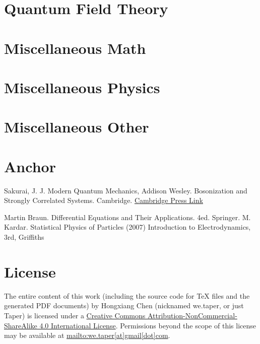 \documentclass{article}
\begin{document}
    

\section{Quantum Field Theory}
\label{sec:Quantum_Field_Theory}


\section{Miscellaneous Math}
\label{sec:Miscellnaneous_Math}


\section{Miscellaneous Physics}
\label{sec:Miscellnaneous_Physics}


\section{Miscellaneous Other}
\label{sec:Miscellaneous_Other}


\section{Anchor}
\begin{thebibliography}{1}
	 Sakurai, J. J. Modern Quantum Mechanics, Addison Wesley.
        Bosonization and Strongly Correlated Systems. Cambridge.
        \href{http://www.cambridge.org/us/academic/subjects/physics/condensed-matter-physics-nanoscience-and-mesoscopic-physics/bosonization-and-strongly-correlated-systems}{Cambridge Press Link}

     Martin Braun. Differential Equations and Their
    Applications. 4ed. Springer.
     M. Kardar. Statistical Physics of Particles (2007)
     Introduction to Electrodynamics, 3rd,
    Griffiths
\end{thebibliography}
\section{License}
The entire content of this work (including the source code
for TeX files and the generated PDF documents) by 
Hongxiang Chen (nicknamed we.taper, or just Taper) is
licensed under a 
\href{http://creativecommons.org/licenses/by-nc-sa/4.0/}{Creative 
Commons Attribution-NonCommercial-ShareAlike 4.0 International 
License}. Permissions beyond the scope of this 
license may be available at \url{mailto:we.taper[at]gmail[dot]com}.
\end{document}
